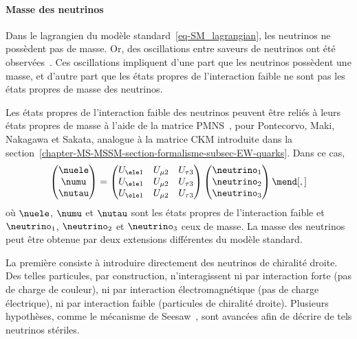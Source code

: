 \paragraph{Masse des neutrinos}
Dans le lagrangien du modèle standard~\eqref{eq-SM_lagrangian}, les neutrinos ne possèdent pas de masse.
Or, des oscillations entre saveurs de neutrinos ont été observées~\cite{neutrino_oscillations_1,neutrino_oscillations_2}.
Ces oscillations impliquent d'une part que les neutrinos possèdent une masse, et d'autre part que les états propres de l'interaction faible ne sont pas les états propres de masse des neutrinos.
\par
Les états propres de l'interaction faible des neutrinos peuvent être reliés à leurs états propres de masse à l'aide de la matrice PMNS~\cite{PMNS_MNS}, pour Pontecorvo, Maki, Nakagawa et Sakata, analogue à la matrice CKM introduite dans la section~\ref{chapter-MS-MSSM-section-formalisme-subsec-EW-quarks}.
Dans ce cas,
\begin{equation}
\begin{pmatrix}
\nuele \\ \numu \\ \nutau
\end{pmatrix}
=
\begin{pmatrix}
U_{\ele 1} & U_{\mu 2} & U_{\tau 3} \\
U_{\ele 1} & U_{\mu 2} & U_{\tau 3} \\
U_{\ele 1} & U_{\mu 2} & U_{\tau 3} \\
\end{pmatrix}
\begin{pmatrix}
\neutrino_1 \\ \neutrino_2 \\ \neutrino_3
\end{pmatrix}
\mend[,]
\end{equation}
où $\nuele$, $\numu$ et $\nutau$ sont les états propres de l'interaction faible et $\neutrino_1$, $\neutrino_2$ et $\neutrino_3$ ceux de masse.
La masse des neutrinos peut être obtenue par deux extensions différentes du modèle standard.
\par
La première consiste à introduire directement des neutrinos de chiralité droite.
Des telles particules, par construction, n'interagissent ni par interaction forte (pas de charge de couleur), ni par interaction électromagnétique (pas de charge électrique), ni par interaction faible (particules de chiralité droite).
Plusieurs hypothèses, comme le mécanisme de Seesaw~\cite{neutrino_masses_1,neutrino_masses_2,neutrino_masses_3,neutrino_masses_4,neutrino_masses_5}, sont avancées afin de décrire de tels neutrinos stériles.
